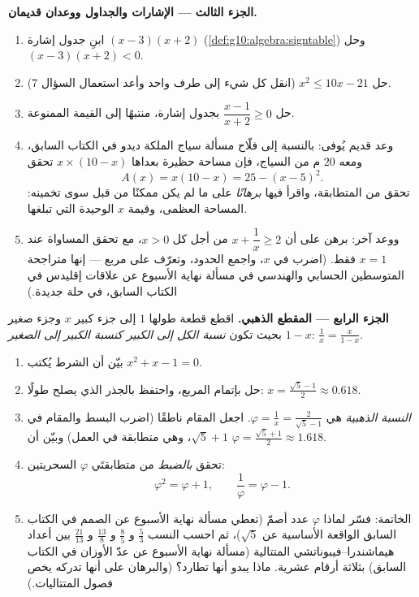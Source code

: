 \begin{problem}[{مسألة نهاية الأسبوع --- مسائل المجموع والجداء،
وإتمام المربع كما رسمه الخوارزمي، والمعادلة
$x^2 = x + 1$}]
\medskip
\noindent\textbf{الجزء الثالث --- الإشارات والجداول ووعدان
قديمان.}
\begin{enumerate}[resume]
  \item ابنِ جدول إشارة $(x - 3)(x + 2)$
        (\cref{def:g10:algebra:signtable}) وحل
        $(x - 3)(x + 2) < 0$.
  \item حل $x^2 \leq 10x - 21$ (انقل كل شيء إلى طرف واحد
        وأعد استعمال السؤال 7).
  \item حل $\dfrac{x - 1}{x + 2} \geq 0$ بجدول إشارة،
        منتبهًا إلى القيمة الممنوعة.
  \item وعد قديم يُوفى: بالنسبة إلى فلّاح
        مسألة سياج الملكة ديدو في الكتاب السابق، ومعه $20$ م من السياج، فإن مساحة
        حظيرة بعداها $x \times (10 - x)$ تحقق
        \[
        A(x) = x(10 - x) = 25 - (x - 5)^2 .
        \]
        تحقق من المتطابقة، واقرأ فيها \emph{برهانًا} على
        ما لم يكن ممكنًا من قبل سوى تخمينه: المساحة العظمى،
        وقيمة $x$ الوحيدة التي تبلغها.
  \item ووعد آخر: برهن على أن $x + \dfrac1x \geq 2$ من أجل كل
        $x > 0$، مع تحقق المساواة عند $x = 1$ فقط. (اضرب في
        $x$، واجمع الحدود، وتعرّف على مربع --- إنها
        متراجحة المتوسطين الحسابي والهندسي في
        مسألة نهاية الأسبوع عن علاقات إقليدس في الكتاب السابق، في حلة جديدة.)
\end{enumerate}

\medskip
\noindent\textbf{الجزء الرابع --- المقطع الذهبي.}
اقطع قطعة طولها $1$ إلى جزء كبير $x$ وجزء صغير
$1 - x$ بحيث تكون
\emph{نسبة الكل إلى الكبير كنسبة الكبير إلى الصغير}:
$\frac{1}{x} = \frac{x}{1 - x}$.
\begin{enumerate}[resume]
  \item بيّن أن الشرط يُكتب $x^2 + x - 1 = 0$.
  \item حل بإتمام المربع، واحتفظ بالجذر الذي
        يصلح طولًا: $x = \frac{\sqrt5 - 1}{2} \approx 0.618$.
  \item \emph{النسبة الذهبية} هي
        $\varphi = \frac1x = \frac{2}{\sqrt5 - 1}$. اجعل المقام
        ناطقًا (اضرب البسط والمقام في
        $\sqrt5 + 1$، وهي متطابقة في العمل) وبيّن أن
        $\varphi = \frac{\sqrt5 + 1}{2} \approx 1.618$.
  \item تحقق \emph{بالضبط} من متطابقتَي
        $\varphi$ السحريتين:
        \[
        \varphi^2 = \varphi + 1,
        \qquad
        \frac{1}{\varphi} = \varphi - 1 .
        \]
  \item الخاتمة: فسّر لماذا $\varphi$ عدد أصمّ
        (تعطي مسألة نهاية الأسبوع عن الصمم في الكتاب السابق الواقعة الأساسية عن
        $\sqrt5$)، ثم احسب النسب $\frac53$ و
        $\frac85$ و $\frac{13}{8}$ و $\frac{21}{13}$ بين
        أعداد هيماشندرا--فيبوناتشي المتتالية
        (مسألة نهاية الأسبوع عن عدّ الأوزان في الكتاب السابق) بثلاثة أرقام عشرية. ماذا
        يبدو أنها تطارد؟ (والبرهان على أنها تدركه
        يخص فصول المتتاليات.)
\end{enumerate}
\end{problem}
